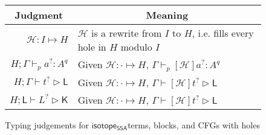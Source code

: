 \documentclass[acmsmall,screen,review]{acmart}
\newcommand{\mc}[1]{\ensuremath{\mathcal{#1}}}
\newcommand{\ms}[1]{\ensuremath{\mathsf{#1}}}
\newcommand{\hasty}[5]{#1 \vdash_{#2} #3: {#4}^{#5}}
\newcommand{\haslb}[3]{#1 \vdash #2 \rhd #3}
\newcommand{\mhole}[1]{{#1}^?}
\newcommand{\mhasty}[6]{#1;#2 \vdash_{#3} #4: {#5}^{#6}}
\newcommand{\mhaslb}[4]{#1;#2 \vdash #3 \rhd #4}
\newcommand{\mlhaslb}[4]{#1;#2 \vdash #3 \rhd #4}
\newcommand{\isrw}[3]{#1: #2 \mapsto #3}
\newcommand{\isotopessa}{\ms{isotope_{SSA}}}
\begin{document}
\begin{figure}
  \begin{center}        
    \begingroup
    \renewcommand{\arraystretch}{1.5}
    \setlength{\tabcolsep}{2em}
    \begin{tabular}{rl}
        \multicolumn{1}{c}{Judgment} & \multicolumn{1}{c}{Meaning} \\ \hline
        \(\isrw{\mc{H}}{I}{H}\) & \(\mc{H}\) is a rewrite from \(I\) to \(H\),
        i.e. fills every hole in \(H\) modulo \(I\) \\
        \(\mhasty{H}{\Gamma}{p}{\mhole{a}}{A}{q}\) & Given
        \(\isrw{\mc{H}}{\cdot}{H}\), \(\hasty{\Gamma}{p}{[\mc{H}]\mhole{a}}{A}{q}\) \\
        \(\mhaslb{H}{\Gamma}{\mhole{t}}{\ms{L}}\) & Given
        \(\isrw{\mc{H}}{\cdot}{H}\), \(\haslb{\Gamma}{[\mc{H}]\mhole{t}}{\ms{L}}\) \\
        \(\mlhaslb{H}{\ms{L}}{\mhole{L}}{\ms{K}}\) & Given
        \(\isrw{\mc{H}}{\cdot}{H}\),
        \(\haslb{\Gamma}{[\mc{H}]\mhole{t}}{\ms{L}}\) \\
    \end{tabular}
    \endgroup
  \end{center}
  \caption{Typing judgements for \isotopessa terms, blocks, and CFGs with holes}
  \label{fig:ssa-holes-judgements}
\end{figure}
\end{document}
